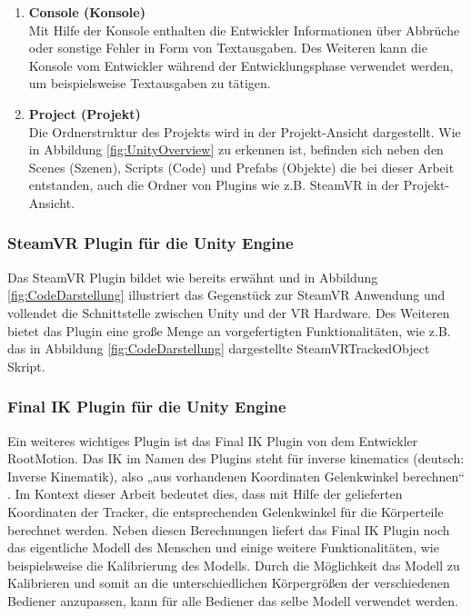 \begin{enumerate}
	\item \textbf{Console (Konsole)} \\
	Mit Hilfe der Konsole enthalten die Entwickler Informationen über Abbrüche oder sonstige Fehler in Form von Textausgaben. Des Weiteren kann die Konsole vom Entwickler während der Entwicklungsphase verwendet werden, um beispielsweise Textausgaben zu tätigen.
	\item \textbf{Project (Projekt)} \\
	Die Ordnerstruktur des Projekts wird in der Projekt-Ansicht dargestellt. Wie in Abbildung \ref{fig:UnityOverview} zu erkennen ist, befinden sich neben den Scenes (Szenen), Scripts (Code) und Prefabs (Objekte) die bei dieser Arbeit entstanden, auch die Ordner von Plugins wie z.B. SteamVR in der Projekt-Ansicht.
\end{enumerate}

\subsubsection{SteamVR Plugin für die Unity Engine}\label{sec:SteamVRPlugin}
Das SteamVR Plugin bildet wie bereits erwähnt und in Abbildung \ref{fig:CodeDarstellung} illustriert das Gegenstück zur SteamVR Anwendung und vollendet die Schnittstelle zwischen Unity und der VR Hardware. Des Weiteren bietet das Plugin eine große Menge an vorgefertigten Funktionalitäten, wie z.B. das in Abbildung \ref{fig:CodeDarstellung} dargestellte SteamVRTrackedObject Skript.

\subsubsection{Final IK Plugin für die Unity Engine}\label{sec:FinalIKPlugin}
Ein weiteres wichtiges Plugin ist das Final IK Plugin von dem Entwickler RootMotion. Das IK im Namen des Plugins steht für inverse kinematics (deutsch: Inverse Kinematik), also „aus vorhandenen Koordinaten Gelenkwinkel berechnen“ \cite[S.20]{31}. Im Kontext dieser Arbeit bedeutet dies, dass mit Hilfe der gelieferten Koordinaten der Tracker, die entsprechenden Gelenkwinkel für die Körperteile berechnet werden. Neben diesen Berechnungen liefert das Final IK Plugin noch das eigentliche Modell des Menschen und einige weitere Funktionalitäten, wie beispielsweise die Kalibrierung des Modells. Durch die Möglichkeit das Modell zu Kalibrieren und somit an die unterschiedlichen Körpergrößen der verschiedenen Bediener anzupassen, kann für alle Bediener das selbe Modell verwendet werden.

